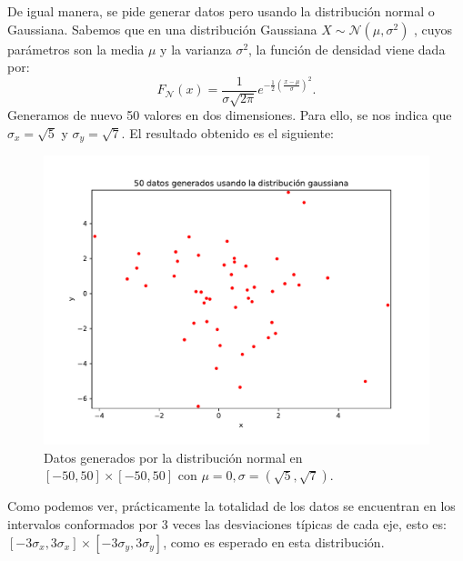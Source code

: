 \documentclass[12pt]{article}
\begin{document}
{De igual manera, se pide generar datos pero usando la distribución normal o Gaussiana. Sabemos que en una distribución Gaussiana $X\sim \mathcal{N}(\mu,\sigma^2)$ , cuyos parámetros son la media $\mu$ y la varianza $\sigma^2$, la función de densidad viene dada por:
$$
F_{\mathcal{N}}(x) = \frac{1}{\sigma \sqrt{2\pi}} e^{- \frac{1}{2} \left(\frac{x - \mu}{\sigma}\right)^2}.
$$
Generamos de nuevo 50 valores en dos dimensiones. Para ello, se nos indica que $\sigma_x = \sqrt{5}$ y $\sigma_y = \sqrt{7}$. El resultado obtenido es el siguiente:
\begin{figure}[H]
  \centering
  \includegraphics[scale = 0.4]{media/50-datos-gauss.pdf}
  \caption{Datos generados por la distribución normal en $[-50,50] \times [-50,50]$ con $\mu = 0, \sigma = (\sqrt{5},\sqrt{7})$.}
  \end{figure}
Como podemos ver, prácticamente la totalidad de los datos se encuentran en los intervalos conformados por 3 veces las desviaciones típicas de cada eje, esto es: $[-3 \sigma_x,3 \sigma_x] \times [-3 \sigma_y , 3 \sigma_y]$, como es esperado en esta distribución.\\


}
\end{document}
